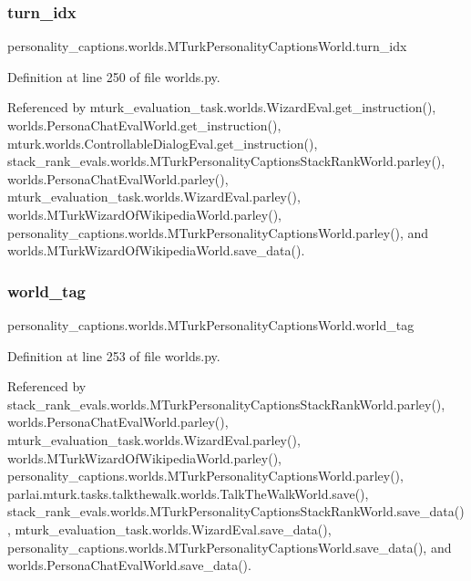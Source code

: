 \subsubsection{\texorpdfstring{turn\+\_\+idx}{turn\_idx}}
{\footnotesize\ttfamily personality\+\_\+captions.\+worlds.\+M\+Turk\+Personality\+Captions\+World.\+turn\+\_\+idx}



Definition at line 250 of file worlds.\+py.



Referenced by mturk\+\_\+evaluation\+\_\+task.\+worlds.\+Wizard\+Eval.\+get\+\_\+instruction(), worlds.\+Persona\+Chat\+Eval\+World.\+get\+\_\+instruction(), mturk.\+worlds.\+Controllable\+Dialog\+Eval.\+get\+\_\+instruction(), stack\+\_\+rank\+\_\+evals.\+worlds.\+M\+Turk\+Personality\+Captions\+Stack\+Rank\+World.\+parley(), worlds.\+Persona\+Chat\+Eval\+World.\+parley(), mturk\+\_\+evaluation\+\_\+task.\+worlds.\+Wizard\+Eval.\+parley(), worlds.\+M\+Turk\+Wizard\+Of\+Wikipedia\+World.\+parley(), personality\+\_\+captions.\+worlds.\+M\+Turk\+Personality\+Captions\+World.\+parley(), and worlds.\+M\+Turk\+Wizard\+Of\+Wikipedia\+World.\+save\+\_\+data().

\mbox{\label{classpersonality__captions_1_1worlds_1_1MTurkPersonalityCaptionsWorld_ac344f28e6b5ef9bdf42428795054418d}} 
\subsubsection{\texorpdfstring{world\+\_\+tag}{world\_tag}}
{\footnotesize\ttfamily personality\+\_\+captions.\+worlds.\+M\+Turk\+Personality\+Captions\+World.\+world\+\_\+tag}



Definition at line 253 of file worlds.\+py.



Referenced by stack\+\_\+rank\+\_\+evals.\+worlds.\+M\+Turk\+Personality\+Captions\+Stack\+Rank\+World.\+parley(), worlds.\+Persona\+Chat\+Eval\+World.\+parley(), mturk\+\_\+evaluation\+\_\+task.\+worlds.\+Wizard\+Eval.\+parley(), worlds.\+M\+Turk\+Wizard\+Of\+Wikipedia\+World.\+parley(), personality\+\_\+captions.\+worlds.\+M\+Turk\+Personality\+Captions\+World.\+parley(), parlai.\+mturk.\+tasks.\+talkthewalk.\+worlds.\+Talk\+The\+Walk\+World.\+save(), stack\+\_\+rank\+\_\+evals.\+worlds.\+M\+Turk\+Personality\+Captions\+Stack\+Rank\+World.\+save\+\_\+data(), mturk\+\_\+evaluation\+\_\+task.\+worlds.\+Wizard\+Eval.\+save\+\_\+data(), personality\+\_\+captions.\+worlds.\+M\+Turk\+Personality\+Captions\+World.\+save\+\_\+data(), and worlds.\+Persona\+Chat\+Eval\+World.\+save\+\_\+data().



